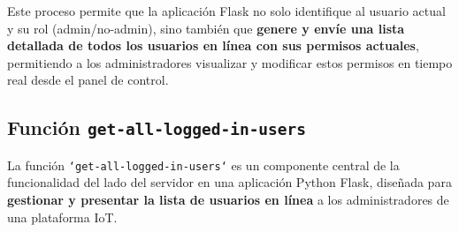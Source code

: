 \documentclass{report}
\begin{document}
Este proceso permite que la aplicación Flask no solo identifique al usuario actual y su rol (admin/no-admin), sino también que \textbf{genere y envíe una 
lista detallada de todos los usuarios en línea con sus permisos actuales}, permitiendo a los administradores visualizar y modificar estos permisos en tiempo 
real desde el panel de control.

\subsection{Función \texttt{get-all-logged-in-users}}
La función \texttt{`get-all-logged-in-users`} es un componente central de la funcionalidad del lado del servidor en una aplicación Python Flask, 
diseñada para \textbf{gestionar y presentar la lista de usuarios en línea} a los administradores de una plataforma IoT.
\end{document}
